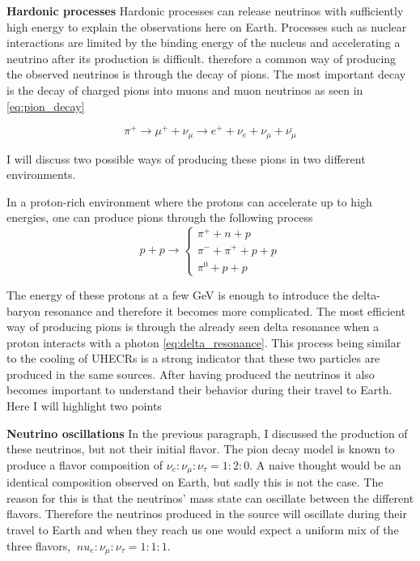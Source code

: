 \documentclass{article}
\begin{document}
\textbf{Hardonic processes}
Hardonic processes can release neutrinos with sufficiently high energy to explain the observations here on Earth. 
Processes such as nuclear interactions are limited by the binding energy of the nucleus and accelerating a neutrino after its production is difficult.
therefore a common way of producing the observed neutrinos is through the decay of pions. The most important decay is the decay of charged pions into muons and muon neutrinos as seen in \ref{eq:pion_decay}


\begin{equation}
    \pi^+ \rightarrow \mu^+ + \nu_\mu \rightarrow e^+ + \nu_e + \nu_\mu + \bar{\nu_\mu}
    \label{eq:pion_decay}
\end{equation}

I will discuss two possible ways of producing these pions in two different environments. 


In a proton-rich environment where the protons can accelerate up to high energies, one can produce pions through the following process
\begin{equation}
    p + p \rightarrow \begin{cases}
        \pi^+ + n+ p \\
        \pi^- + \pi^+ +p + p  \\
        \pi^0 + p+p
    \end{cases}
\end{equation}

The energy of these protons at a few GeV is enough to introduce the delta-baryon resonance and therefore it becomes more complicated.
The most efficient way of producing pions is through the already seen delta resonance when a proton interacts with a photon \ref{eq:delta_resonance}.
This process being similar to the cooling of UHECRs is a strong indicator that these two particles are produced in the same sources. 
After having produced the neutrinos it also becomes important to understand their behavior during their travel to Earth. Here I will highlight two points


\textbf{Neutrino oscillations}
In the previous paragraph, I discussed the production of these neutrinos, but not their initial flavor.
The pion decay model is known to produce a flavor composition of $\nu_e : \nu_\mu : \nu_\tau = 1:2:0$. 
A naive thought would be an identical composition observed on Earth, but sadly this is not the case. 
The reason for this is that the neutrinos' mass state can oscillate between the different flavors. Therefore the neutrinos produced in the source will oscillate during their travel to Earth and when they reach us one would expect a 
uniform mix of the three flavors, $\ nu_e: \nu_\mu: \nu_\tau = 1:1:1$.
\end{document}
